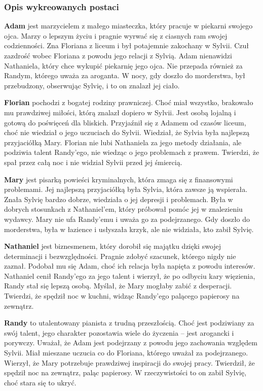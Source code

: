 \subsubsection*{Opis wykreowanych postaci}

\textbf{Adam} jest marzycielem z małego miasteczka, który pracuje w piekarni swojego ojca. Marzy o lepszym
życiu i pragnie wyrwać się z ciasnych ram swojej codzienności. Zna Floriana z liceum i był
potajemnie zakochany w Sylvii. Czuł zazdrość wobec Floriana z powodu jego relacji z Sylvią.
Adam nienawidzi Nathaniela, który chce wykupić piekarnię jego ojca. Nie przepada również za
Randym, którego uważa za aroganta. W nocy, gdy doszło do morderstwa, był przebudzony, obserwując
Sylvię, i to on znalazł jej ciało.

\textbf{Florian} pochodzi z bogatej rodziny prawniczej. Choć miał wszystko, brakowało mu prawdziwej miłości,
którą znalazł dopiero w Sylvii. Jest osobą lojalną i gotową do poświęceń dla bliskich. Przyjaźnił
się z Adamem od czasów liceum, choć nie wiedział o jego uczuciach do Sylvii. Wiedział, że Sylvia
była najlepszą przyjaciółką Mary. Florian nie lubi Nathaniela za jego metody działania, ale
podziwia talent Randy'ego, nie wiedząc o jego problemach z prawem. Twierdzi, że spał przez całą
noc i nie widział Sylvii przed jej śmiercią.

\textbf{Mary} jest pisarką powieści kryminalnych, która zmaga się z finansowymi problemami. Jej najlepszą
przyjaciółką była Sylvia, która zawsze ją wspierała. Znała Sylvię bardzo dobrze, wiedziała o jej
depresji i problemach. Była w dobrych stosunkach z Nathaniel'em, który próbował pomóc jej w
znalezieniu wydawcy. Mary nie ufa Randy'emu i uważa go za podejrzanego. Gdy doszło do morderstwa,
była w łazience i usłyszała krzyk, ale nie widziała, kto zabił Sylvię.

\textbf{Nathaniel} jest biznesmenem, który dorobił się majątku dzięki swojej determinacji i bezwzględności.
Pragnie zdobyć szacunek, którego nigdy nie zaznał. Podobał mu się Adam, choć ich relacja była
napięta z powodu interesów. Nathaniel cenił Randy'ego za jego talent i wierzył, że po odbyciu kary
więzienia, Randy stał się lepszą osobą. Myślał, że Mary mogłaby zabić z desperacji. Twierdzi, że
spędził noc w kuchni, widząc Randy'ego palącego papierosy na zewnątrz.

\textbf{Randy} to utalentowany pianista z trudną przeszłością. Choć jest podziwiany za swój talent, jego
charakter pozostawia wiele do życzenia – jest arogancki i porywczy. Uważał, że Adam jest podejrzany
z powodu jego zachowania względem Sylvii. Miał mieszane uczucia co do Floriana, którego uważał za
podejrzanego. Wierzył, że Mary potrzebuje prawdziwej inspiracji do swojej pracy. Twierdził, że
spędził noc na zewnątrz, paląc papierosy. W rzeczywistości to on zabił Sylvię, choć stara się to
ukryć.

